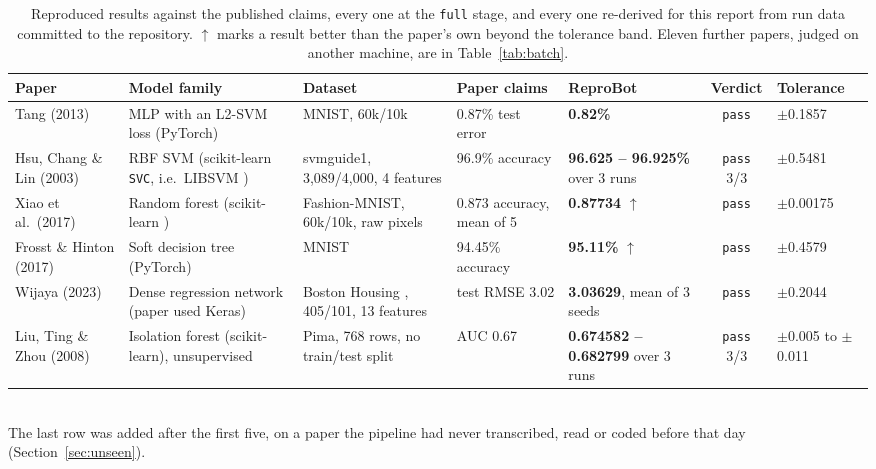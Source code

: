 \documentclass[11pt]{article}
\newcommand{\squeeze}{\setlength{\tabcolsep}{4pt}}
\begin{document}
\begin{table}[tbp]
\centering
\small
\caption{Reproduced results against the published claims, every one at the \texttt{full} stage,
and every one re-derived for this report from run data committed to the repository. $\uparrow$
marks a result better than the paper's own beyond the tolerance band. Eleven further papers,
judged on another machine, are in Table~\ref{tab:batch}.}
\label{tab:fidelity}
\squeeze
\begin{tabular}{L{0.14\textwidth}L{0.14\textwidth}L{0.12\textwidth}L{0.095\textwidth}L{0.105\textwidth}cL{0.095\textwidth}}
\toprule
Paper & Model family & Dataset & Paper claims & ReproBot & Verdict & Tolerance \\
\midrule
Tang (2013) \cite{tang2013dlsvm} & MLP with an L2-SVM loss (PyTorch) & MNIST, 60k/10k & 0.87\%
  test error & \textbf{0.82\%} & \texttt{pass} & $\pm$0.1857 \\
Hsu, Chang \& Lin (2003) \cite{hsu2003guide} & RBF SVM (scikit-learn \texttt{SVC}, i.e.\ LIBSVM
  \cite{chang2011libsvm}) & svmguide1, 3{,}089/4{,}000, 4 features & 96.9\% accuracy &
  \textbf{96.625 -- 96.925\%} over 3 runs & \texttt{pass} 3/3 & $\pm$0.5481 \\
Xiao et al.\ (2017) \cite{xiao2017fashion} & Random forest (scikit-learn
  \cite{pedregosa2011sklearn}) & Fashion-MNIST, 60k/10k, raw pixels & 0.873 accuracy, mean of 5 &
  \textbf{0.87734} $\uparrow$ & \texttt{pass} & $\pm$0.00175 \\
Frosst \& Hinton (2017) \cite{frosst2017soft} & Soft decision tree (PyTorch) & MNIST & 94.45\%
  accuracy & \textbf{95.11\%} $\uparrow$ & \texttt{pass} & $\pm$0.4579 \\
Wijaya (2023) \cite{wijaya2023housing} & Dense regression network (paper used Keras) & Boston
  Housing \cite{harrison1978hedonic}, 405/101, 13 features & test RMSE 3.02 & \textbf{3.03629},
  mean of 3 seeds & \texttt{pass} & $\pm$0.2044 \\
\midrule
Liu, Ting \& Zhou (2008) \cite{liu2008iforest} & Isolation forest (scikit-learn), unsupervised &
  Pima, 768 rows, no train/test split & AUC 0.67 & \textbf{0.674582 -- 0.682799} over 3 runs &
  \texttt{pass} 3/3 & $\pm$0.005 to $\pm$0.011 \\
\bottomrule
\end{tabular}
\\[2pt]
{\small The last row was added after the first five, on a paper the pipeline had never
transcribed, read or coded before that day (Section~\ref{sec:unseen}).}
\end{table}
\end{document}
